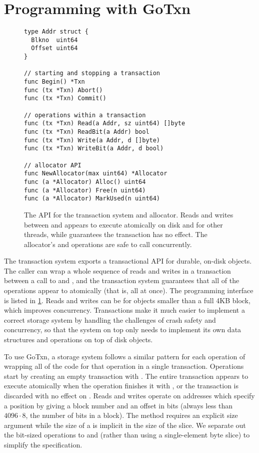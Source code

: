 \section{Programming with GoTxn}
\label{sec:txn:api}

\begin{figure}
\begin{verbatim}
type Addr struct {
  Blkno  uint64
  Offset uint64
}

// starting and stopping a transaction
func Begin() *Txn
func (tx *Txn) Abort()
func (tx *Txn) Commit()

// operations within a transaction
func (tx *Txn) Read(a Addr, sz uint64) []byte
func (tx *Txn) ReadBit(a Addr) bool
func (tx *Txn) Write(a Addr, d []byte)
func (tx *Txn) WriteBit(a Addr, d bool)

// allocator API
func NewAllocator(max uint64) *Allocator
func (a *Allocator) Alloc() uint64
func (a *Allocator) Free(n uint64)
func (a *Allocator) MarkUsed(n uint64)
\end{verbatim}
  \caption[GoTxn API]{The API for the transaction system and allocator. Reads and writes
    between  and  appears to execute atomically on disk and
    for other threads, while  guarantees the transaction has no
    effect. The allocator's  and  operations are safe to call
    concurrently.}
\label{fig:txn-api}
\end{figure}

The transaction system exports a transactional API for durable, on-disk objects. The caller can wrap a whole
sequence of reads and writes in a transaction between a call to  and
, and the transaction system guarantees that all of the operations
appear to atomically (that is, all at once). The
programming interface is listed in \cref{fig:txn-api}. Reads and writes can be
for objects smaller than a full 4KB block, which improves concurrency.
Transactions make it much easier to implement a correct storage system by
handling the challenges of crash safety and concurrency, so that the system on
top only needs to implement its own data structures and operations on top of
disk objects.

To use GoTxn, a storage system follows a similar pattern for each operation of
wrapping all of the code for that operation in a single transaction. Operations
start by creating an empty transaction with .
The entire
transaction appears to execute atomically when the operation finishes it
with , or the transaction is discarded with no effect on
. Reads and writes operate on addresses which specify a
position by giving a block number and an offset in bits (always less
than $4096 \cdot 8$, the number of bits in a block). The 
method requires an explicit size argument while the size of a
 is implicit in the size of the  slice. We separate
out the bit-sized operations to  and  (rather
than using a single-element byte slice) to simplify the specification.


